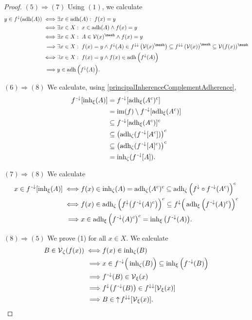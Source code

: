 \begin{proof}
$(5) \Rightarrow (7)$ Using $(1)$, we calculate
\begin{align*}
y\in f^\imf(\adh(A)) \iff& \exists x\in \adh(A):\;f(x) = y\\
\iff& \exists x\in X: \; x\in \adh(A) \land f(x) = y\\
\iff& \exists x\in X: \; A\in\vicinities(x)^{\mesh}  \land f(x) = y \\
\implies& \exists x\in X: \; f(x) = y \land f^\imf(A)\in f^{\imf\imf}\left(\vicinities(x)^{\mesh}\right) \subseteq f^{\imf\imf}\left(\vicinities(x)\right)^{\mesh} \subseteq \vicinities(f(x))^{\mesh} \\
\iff& \exists x\in X: \; f(x) = y \land f(x)\in \adh\Big(f^\imf(A)\Big) \\
\implies& y\in \adh\Big(f^\imf(A)\Big).
\end{align*}

$(6) \Rightarrow (8)$ We calculate, using \ref{principalInherenceComplementAdherence},
\begin{align*}
f^{\text{\hspace{0.15em}-}\downarrow}[\operatorname{inh}_\xi(A)] &= f^{\text{\hspace{0.15em}-}\downarrow}[\operatorname{adh}_\xi(A^c)^c] \\
&= \operatorname{im}(f)\setminus f^{{\text{\hspace{0.15em}-}\downarrow}}[\operatorname{adh}_\xi(A^c)] \\
&\subseteq f^{{\text{\hspace{0.15em}-}\downarrow}}[\operatorname{adh}_\xi(A^c)]^c \\
&\subseteq \left(\operatorname{adh}_\zeta(f^{{\text{\hspace{0.15em}-}\downarrow}}[A^c])\right)^c \\
&\subseteq \left(\operatorname{adh}_\zeta(f^{{\text{\hspace{0.15em}-}\downarrow}}[A]^c)\right)^c \\
&= \operatorname{inh}_\zeta(f^{{\text{\hspace{0.15em}-}\downarrow}}[A]).
\end{align*}

$(7) \Rightarrow (8)$ We calculate
\begin{align*}
x\in f^{\text{\hspace{0.15em}-}\downarrow}[\operatorname{inh}_\xi(A)] \iff& f(x) \in \operatorname{inh}_\zeta(A) = \operatorname{adh}_\zeta(A^c)^c \subseteq \operatorname{adh}_\zeta\Big(f^\downarrow\circ f^{{\text{\hspace{0.15em}-}\downarrow}}(A^c)\Big)^c \\
\iff& f(x) \in \operatorname{adh}_\zeta\Big(f^\downarrow\big(f^{{\text{\hspace{0.15em}-}\downarrow}}(A)^c\big)\Big)^c \subseteq f^\downarrow\Big(\operatorname{adh}_\xi\Big(f^{{\text{\hspace{0.15em}-}\downarrow}}(A)^c\big)\Big)^c \\
\implies& x\in \operatorname{adh}_\xi\Big(f^{{\text{\hspace{0.15em}-}\downarrow}}(A)^c\big)^c = \operatorname{inh}_\xi\big(f^{{\text{\hspace{0.15em}-}\downarrow}}(A)\big).
\end{align*}

$(8) \Rightarrow (5)$ We prove (1) for all $x\in X$. We calculate
\begin{align*}
B\in \operatorname{\mathcal{V}}_\zeta(f(x)) \iff& f(x) \in \operatorname{inh}_\zeta(B) \\
\implies& x\in f^{{\text{\hspace{0.15em}-}\downarrow}}\Big(\operatorname{inh}_\zeta(B)\Big) \subseteq \operatorname{inh}_\xi\Big(f^{\text{\hspace{0.15em}-}\downarrow}(B)\Big) \\
\implies& f^{\text{\hspace{0.15em}-}\downarrow}(B) \in \operatorname{\mathcal{V}}_\xi(x) \\
\implies& f^\downarrow\big(f^{\text{\hspace{0.15em}-}\downarrow}(B)\big) \in f^{\downarrow\downarrow}[\operatorname{\mathcal{V}}_\xi(x)] \\
\implies& B \in \operatorname{\uparrow} f^{\downarrow\downarrow}[\operatorname{\mathcal{V}}_\xi(x)].
\end{align*}
\end{proof}
